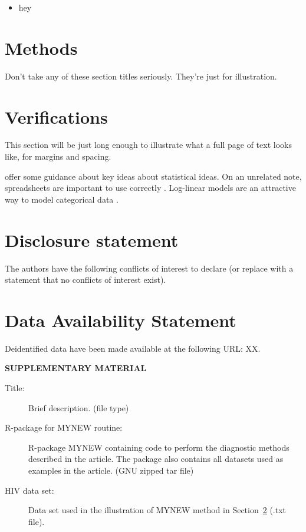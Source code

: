 \documentclass[
  12pt]{article}
\providecommand{\tightlist}{%
  \setlength{\itemsep}{0pt}\setlength{\parskip}{0pt}}\usepackage{longtable,booktabs,array}
\begin{document}
\begin{itemize}
\tightlist
\item hey
\end{itemize}

\section{Methods}\label{sec-meth}

Don't take any of these section titles seriously. They're just for
illustration.

\section{Verifications}\label{sec-verify}

This section will be just long enough to illustrate what a full page of
text looks like, for margins and spacing.

\addtolength{\textheight}{.5in}%

\citet{gelm:veht:2021} offer some guidance about key ideas about
statistical ideas. On an unrelated note, spreadsheets are important to
use correctly \citep{brom:woo:2018}. Log-linear models are an attractive
way to model categorical data \citep{bish:fien:1975}.

\section{Disclosure statement}\label{disclosure-statement}

The authors have the following conflicts of interest to declare (or
replace with a statement that no conflicts of interest exist).

\section{Data Availability Statement}\label{data-availability-statement}

Deidentified data have been made available at the following URL: XX.

\label{supplementary-material}
\bigskip

\begin{center}

{\large\bf SUPPLEMENTARY MATERIAL}

\end{center}

\begin{description}
\item[Title:]
Brief description. (file type)
\item[R-package for MYNEW routine:]
R-package MYNEW containing code to perform the diagnostic methods
described in the article. The package also contains all datasets used as
examples in the article. (GNU zipped tar file)
\item[HIV data set:]
Data set used in the illustration of MYNEW method in
Section~\ref{sec-verify} (.txt file).
\end{description}
\end{document}
